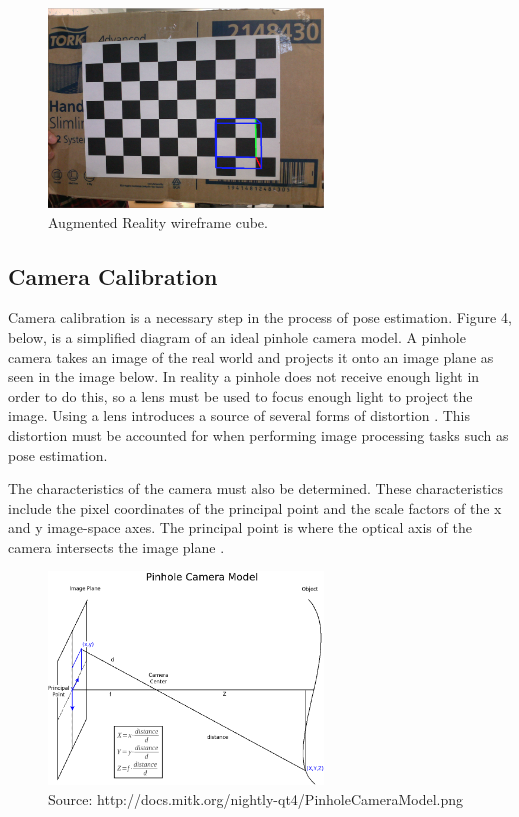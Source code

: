 \documentclass{article}
\begin{document}
\begin{figure}[H]
\begin{center}
\includegraphics[width=0.65\textwidth]{arCube} 
\caption{Augmented Reality wireframe cube.}
\end{center}
\end{figure}

\subsection{Camera Calibration}

Camera calibration is a necessary step in the process of pose estimation. Figure 4, below, is a simplified diagram of an ideal pinhole camera model. A pinhole camera takes an image of the real world and projects it onto an image plane \cite{pinhole} as seen in the image below. In reality a pinhole does not receive enough light in order to do this, so a lens must be used to focus enough light to project the image. Using a lens introduces a source of several forms of distortion \cite{calib1}. This distortion must be accounted for when performing image processing tasks such as pose estimation. \par

The characteristics of the camera must also be determined. These characteristics include the pixel coordinates of the principal point and the scale factors of the x and y image-space axes. The principal point is where the optical axis of the camera intersects the image plane \cite{wikicalib}.

\vspace*{2\baselineskip}

\begin{figure}[H]
\begin{center}
\includegraphics[width=0.65\textwidth]{PinholeCameraModel}
\caption{Source: http://docs.mitk.org/nightly-qt4/PinholeCameraModel.png}
\end{center}
\end{figure}
\end{document}
